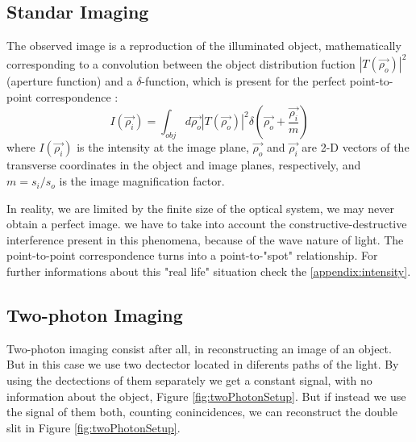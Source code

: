 \subsection{Standar Imaging}

The observed image is a reproduction of the illuminated object, mathematically
corresponding to a convolution between the object distribution fuction $ |T(\vec{\rho_o})|^2$ (aperture function) 
and a $\delta$-function, which is present for the perfect
point-to-point correspondence \cite{introquantumoptics}:
\begin{equation}
I(\vec{\rho_i})=\int_{obj} d\vec{\rho_o} |T(\vec{\rho_o})|^2 \delta(\vec{\rho_o}+\frac{\vec{\rho_i}}{m})
\end{equation}
where $I(\vec{\rho_i})$ is the intensity at the image plane, $\vec{\rho_o}$ and $\vec{\rho_i}$ are 2-D vectors of the
transverse coordinates in the object and image planes, respectively, and
$m=s_i/s_o$ is the image magnification factor.

In reality, we are limited by the finite size of the optical system, we may never obtain a perfect image.
we have to take into account the constructive-destructive interference present
in this phenomena, because of the wave nature of light. The point-to-point correspondence turns into a point-to-"spot" relationship.
For further informations about this "real life" situation check the \ref{appendix:intensity}.



\subsection{Two-photon Imaging}

Two-photon imaging consist after all, in reconstructing an image of an object. But in this case we use two dectector located in diferents paths of the light. By using the dectections of them separately we get a constant signal, with no information about the object, Figure \ref{fig:twoPhotonSetup}. But if instead we use the signal of them both, counting conincidences, we can reconstruct the double slit in Figure \ref{fig:twoPhotonSetup}. \\


